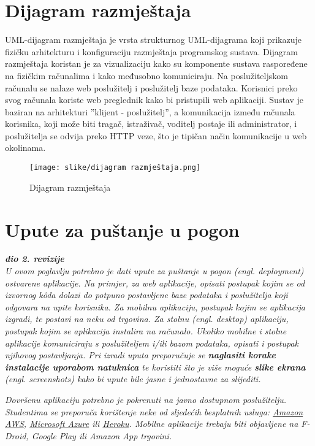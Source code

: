 			\eject 
		
		
		\section{Dijagram razmještaja}

		UML-dijagram razmještaja je vrsta strukturnog UML-dijagrama 
		koji prikazuje fizičku arhitekturu i konfiguraciju 
		razmještaja programskog sustava. Dijagram razmještaja koristan je 
		za vizualizaciju kako su komponente sustava raspoređene na fizičkim 
		računalima i kako međusobno komuniciraju.
		Na poslužiteljskom računalu se 
		nalaze web poslužitelj i poslužitelj baze podataka. Korisnici preko svog računala koriste web
		preglednik kako bi pristupili web aplikaciji. Sustav je baziran na arhitekturi 
		”klijent - poslužitelj”, a komunikacija između računala korisnika, 
		koji može biti tragač, istraživač, voditelj postaje ili administrator, i poslužitelja se 
		odvija preko HTTP veze, što je tipičan način komunikacije u web okolinama.

		\begin{figure}[H]
			\texttt{[image: slike/dijagram razmještaja.png]}
			\centering
			\caption{Dijagram razmještaja}
			\label{fig:dijagram razmještaja}
		\end{figure}
			\eject 
		
		\section{Upute za puštanje u pogon}
		
			\textbf{\textit{dio 2. revizije}}\\
		
			 \textit{U ovom poglavlju potrebno je dati upute za puštanje u pogon (engl. deployment) ostvarene aplikacije. Na primjer, za web aplikacije, opisati postupak kojim se od izvornog kôda dolazi do potpuno postavljene baze podataka i poslužitelja koji odgovara na upite korisnika. Za mobilnu aplikaciju, postupak kojim se aplikacija izgradi, te postavi na neku od trgovina. Za stolnu (engl. desktop) aplikaciju, postupak kojim se aplikacija instalira na računalo. Ukoliko mobilne i stolne aplikacije komuniciraju s poslužiteljem i/ili bazom podataka, opisati i postupak njihovog postavljanja. Pri izradi uputa preporučuje se \textbf{naglasiti korake instalacije uporabom natuknica} te koristiti što je više moguće \textbf{slike ekrana} (engl. screenshots) kako bi upute bile jasne i jednostavne za slijediti.}
			
			
			 \textit{Dovršenu aplikaciju potrebno je pokrenuti na javno dostupnom poslužitelju. Studentima se preporuča korištenje neke od sljedećih besplatnih usluga: \href{https://aws.amazon.com/}{Amazon AWS}, \href{https://azure.microsoft.com/en-us/}{Microsoft Azure} ili \href{https://www.heroku.com/}{Heroku}. Mobilne aplikacije trebaju biti objavljene na F-Droid, Google Play ili Amazon App trgovini.}
			
			
			\eject 
